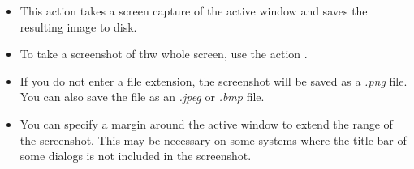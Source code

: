 
\begin{itemize}
\item This action takes a screen capture of the active window and saves the resulting image to disk.
\item To take a screenshot of thw whole screen, use the action . 
\item If you do not enter a file extension, the screenshot will be saved as a \emph{.png} file. You can also save the file as an \emph{.jpeg} or \emph{.bmp} file.
\item You can specify a margin around the active window to extend the range of the screenshot. This may be necessary on some systems where the title bar of some dialogs is not included in the screenshot. 
\end{itemize}
